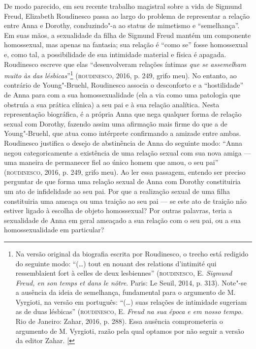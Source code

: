 De modo parecido, em seu recente trabalho magistral sobre a vida de
Sigmund Freud, Elizabeth Roudinesco passa ao largo do problema de
representar a relação entre Anna e Dorothy, conduzindo"-a ao status de
mimetismo e ``semelhança''. Em suas mãos, a sexualidade da filha de
Sigmund Freud mantém um componente homossexual, mas apenas na fantasia;
sua relação é ``como se'' fosse homossexual e, como tal, a possibilidade
de sua intimidade material e física é apagada. Roudinesco escreve que
elas ``desenvolveram relações íntimas \emph{que se assemelham muito às
das lésbicas}''\footnote{Na versão original da biografia escrita por
  Roudinesco, o trecho está redigido do seguinte modo: ``(\ldots{}) tout
  en nouant des relations d'intimité qui ressemblaient fort à celles de
  deux lesbiennes'' (\textsc{roudinesco}, E. \emph{Sigmund Freud, en son temps
  et dans le nôtre}. Paris: Le Seuil, 2014, p. 313). Note"-se a ausência
  da ideia de semelhança, fundamental para o argumento de M. Vyrgioti,
  na versão em português: ``(\ldots{}) suas relações de intimidade
  sugeriam as de duas lésbicas'' (\textsc{roudinesco}, E. \emph{Freud na sua
  época e em nosso tempo}. Rio de Janeiro: Zahar, 2016, p. 288). Essa
  ausência comprometeria o argumento de M. Vyrgioti, razão pela qual
  optamos por não seguir a versão da editor Zahar. {[}\versal{N.~T.}{]}}
(\textsc{roudinesco}, 2016, p. 249, grifo meu). No entanto, ao contrário de
Young"-Bruehl, Roudinesco associa o desconforto e a ``hostilidade'' de Anna
para com a sua homossexualidade (ela a via como uma patologia que
obstruía a sua prática clínica) a seu pai e à sua relação analítica.
Nesta representação biográfica, é a própria Anna que nega qualquer forma
de relação sexual com Dorothy, fazendo assim uma afirmação mais firme do
que a de Young"-Bruehl, que atua como intérprete confirmando a amizade
entre ambas. Roudinesco justifica o desejo de abstinência de Anna do
seguinte modo: ``Anna negou categoricamente a existência de uma relação
sexual com sua nova amiga --- uma maneira de permanecer fiel ao único
homem que amou, o seu pai'' (\textsc{roudinesco}, 2016, p. 249, grifo meu). Ao ler
essa passagem, entendo ser preciso perguntar de que forma uma relação
sexual de Anna com Dorothy constituiria um ato de infidelidade ao seu
pai. Por que a realização sexual de uma filha constituiria uma ameaça ou
uma traição ao seu pai --- se este ato de traição não estiver ligado à
escolha de objeto homossexual? Por outras palavras, teria a sexualidade
de Anna em geral ameaçado a sua relação com o seu pai, ou a sua
homossexualidade em particular?

